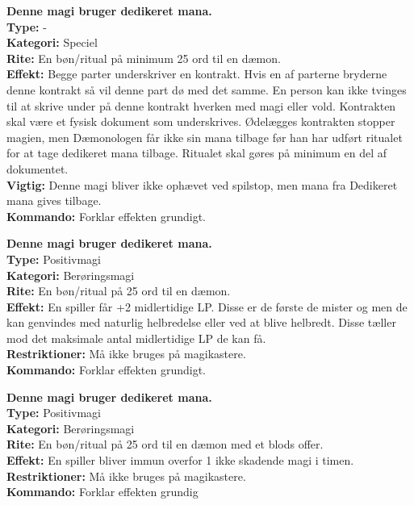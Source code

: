 \begin{sjæl*}
\textbf{Denne magi bruger dedikeret mana.}\\
\textbf{Type:} - \\
\textbf{Kategori:} Speciel\\
\textbf{Rite:} En bøn/ritual på minimum 25 ord til en dæmon.\\
\textbf{Effekt:} Begge parter underskriver en kontrakt. Hvis en af parterne bryderne denne kontrakt så vil denne part dø med det samme. En person kan ikke tvinges til at skrive under på denne kontrakt hverken med magi eller vold. Kontrakten skal være et fysisk dokument som underskrives. Ødelægges kontrakten stopper magien, men Dæmonologen får ikke sin mana tilbage før han har udført ritualet for at tage dedikeret mana tilbage. Ritualet skal gøres på minimum en del af dokumentet.\\
\textbf{Vigtig:} Denne magi bliver ikke ophævet ved spilstop, men mana fra Dedikeret mana gives tilbage.\\
\textbf{Kommando:} Forklar effekten grundigt.
\end{sjæl*}


\begin{sjæl*}[Følelsesløs]
\textbf{Denne magi bruger dedikeret mana.}\\
\textbf{Type:} Positivmagi\\
\textbf{Kategori:} Berøringsmagi\\
\textbf{Rite:} En bøn/ritual på 25 ord til en dæmon.\\
\textbf{Effekt:} En spiller får +2 midlertidige LP. Disse er de første de mister og men de kan genvindes med naturlig helbredelse eller ved at blive helbredt. Disse tæller mod det maksimale antal midlertidige LP de kan få.\\
\textbf{Restriktioner:} Må ikke bruges på magikastere.\\
\textbf{Kommando:} Forklar effekten grundigt.
\end{sjæl*}

\begin{sjæl*}
\textbf{Denne magi bruger dedikeret mana.}\\
\textbf{Type:} Positivmagi\\ 
\textbf{Kategori:} Berøringsmagi\\
\textbf{Rite:} En bøn/ritual på 25 ord til en dæmon med et blods offer.\\
\textbf{Effekt:} En spiller bliver immun overfor 1 ikke skadende magi i timen.\\
\textbf{Restriktioner:} Må ikke bruges på magikastere.\\
\textbf{Kommando:} Forklar effekten grundig
\end{sjæl*}

